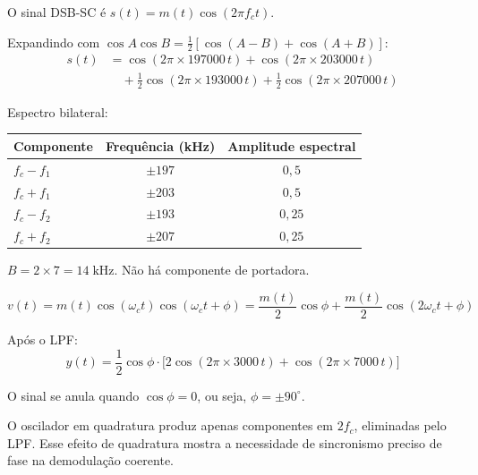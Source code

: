 \documentclass[11pt,a4paper]{article}
\begin{document}
\begin{resolucao}

O sinal DSB-SC é $s(t) = m(t)\cos(2\pi f_c t)$.

Expandindo com $\cos A \cos B = \frac{1}{2}[\cos(A-B) + \cos(A+B)]$:
\begin{align*}
  s(t) &= \cos(2\pi \times 197000\,t) + \cos(2\pi \times 203000\,t) \\
  &\quad + \tfrac{1}{2}\cos(2\pi \times 193000\,t) + \tfrac{1}{2}\cos(2\pi \times 207000\,t)
\end{align*}

Espectro bilateral:

\begin{center}
\small
\begin{tabular}{lcc}
  \toprule
  Componente & Frequência (kHz) & Amplitude espectral \\
  \midrule
  $f_c - f_1$ & $\pm 197$ & $0{,}5$ \\
  $f_c + f_1$ & $\pm 203$ & $0{,}5$ \\
  $f_c - f_2$ & $\pm 193$ & $0{,}25$ \\
  $f_c + f_2$ & $\pm 207$ & $0{,}25$ \\
  \bottomrule
\end{tabular}
\end{center}

$B = 2 \times 7 = 14\;\text{kHz}$. Não há componente de portadora.
\end{resolucao}

\begin{resolucao}

\[
  v(t) = m(t)\cos(\omega_c t)\cos(\omega_c t + \phi) = \frac{m(t)}{2}\cos\phi + \frac{m(t)}{2}\cos(2\omega_c t + \phi)
\]

Após o LPF:
\[
  \boxed{y(t) = \frac{1}{2}\cos\phi \cdot \big[2\cos(2\pi \times 3000\,t) + \cos(2\pi \times 7000\,t)\big]}
\]
\end{resolucao}

\begin{resolucao}

O sinal se anula quando $\cos\phi = 0$, ou seja, $\boxed{\phi = \pm 90^\circ}$.

O oscilador em quadratura produz apenas componentes em $2f_c$, eliminadas pelo LPF. Esse efeito de quadratura mostra a necessidade de sincronismo preciso de fase na demodulação coerente.
\end{resolucao}
\end{document}
